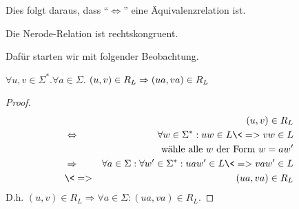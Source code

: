 Dies folgt daraus, dass "`$\Leftrightarrow$"' eine Äquivalenzrelation ist.
\begin{lemma}\label{lem:2.nerode-rechtskongruent}
   Die Nerode-Relation ist rechtskongruent.
\end{lemma}
Dafür starten wir mit folgender Beobachtung.
\begin{lemma}\label{lem:2.nerode-rechtsabgeschlossen}
  $\forall u, v \in \Sigma^*. \forall a \in \Sigma$. $(u,v) \in R_L \=> (ua, va) \in R_L$
\end{lemma}
\begin{proof}
     \begin{eqnarray*}
       &&(u,v) \in R_L\\
       &\Leftrightarrow& \forall w\in\Sigma^*: uw\in L \<=> vw\in L \\
       && \text{wähle alle $w$ der Form $w = aw'$} \\
       &\Rightarrow& \forall a\in\Sigma:\forall w'\in\Sigma^*: uaw'\in L \<=>
                     vaw'\in L \\
       & \<=> & (ua, va) \in R_L
     \end{eqnarray*}
     D.h. $(u,v) \in R_L \Rightarrow \forall a\in\Sigma: (ua, va) \in
     R_L$.
\end{proof}
